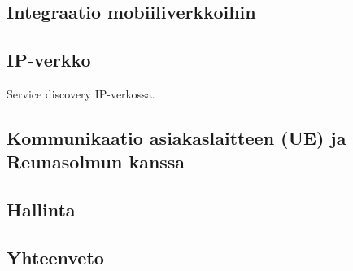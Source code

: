 \documentclass[finnish]{tktltiki2}
\theoremstyle{definition}
\theoremstyle{remark}
\begin{document}
\subsection{Integraatio mobiiliverkkoihin}
\subsection{IP-verkko}
Service discovery IP-verkossa.
\subsection{Kommunikaatio asiakaslaitteen (UE) ja Reunasolmun kanssa}
\subsection{Hallinta}


\subsection{Yhteenveto}

 




\lastpage



% 
\end{document}
